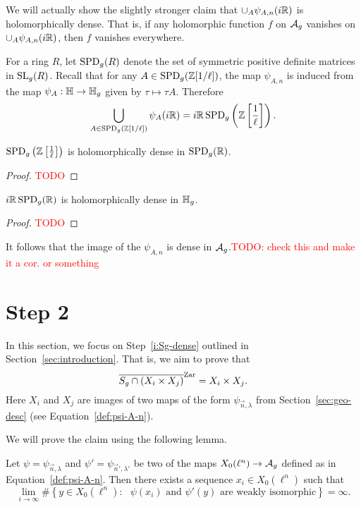 \documentclass{amsart}
\begin{document}
We will actually show the slightly stronger claim that $\cup_{A} \psi_{A,n}(i\mathbb{R})$ is holomorphically dense. That is, if any holomorphic function $f$ on $\mathcal{A}_g$ vanishes on $\cup_{A} \psi_{A,n}(i\mathbb{R})$, then $f$ vanishes everywhere.

For a ring $R$, let $\operatorname{SPD}_g(R)$ denote the set of symmetric positive definite matrices in $\operatorname{SL}_g(R)$. Recall that for any $A \in \operatorname{SPD}_g(\mathbb{Z}[1/\ell])$, the map $\psi_{A,n}$ is induced from the map $\psi_A: \mathbb{H} \to \mathbb{H}_g$ given by $\tau \mapsto \tau A$. Therefore
\[
  \bigcup_{A \in \operatorname{SPD}_g(\mathbb{Z}[1/\ell])} \psi_A(i\mathbb{R}) = i\mathbb{R}\operatorname{SPD}_g\left(\mathbb{Z}\left[\frac{1}{\ell}\right]\right).
\]

\begin{lemma}
  $\operatorname{SPD}_g\left(\mathbb{Z}\left[\frac{1}{\ell}\right]\right)$ is holomorphically dense in $\operatorname{SPD}_g(\mathbb{R})$.
\end{lemma}
\begin{proof}
  \textcolor{red}{TODO}
\end{proof}

\begin{lemma}
  $i\mathbb{R}\operatorname{SPD}_g(\mathbb{R})$ is holomorphically dense in $\mathbb{H}_g$.
\end{lemma}
\begin{proof}
  \textcolor{red}{TODO}
\end{proof}

It follows that the image of the $\psi_{A,n}$ is dense in $\mathcal{A}_g$.\textcolor{red}{TODO: check this and make it a cor. or something}

\section{Step 2}
\label{sec:step-2}

In this section, we focus on Step~\ref{i:Sg-dense} outlined in Section~\ref{sec:introduction}. That is, we aim to prove that
\[
  \overline{S_g \cap (X_i \times X_j)}^\mathrm{Zar} = X_i \times X_j.
\]
Here $X_i$ and $X_j$ are images of two maps of the form $\psi_{\vec{n},\lambda}$ from Section~\ref{sec:geo-desc} (see Equation~\ref{def:psi-A-n}).

We will prove the claim using the following lemma.

\begin{lemma}\label{lem:lim-degree}
  Let $\psi = \psi_{\vec{n},\lambda}$ and $\psi' = \psi_{\vec{n}',\lambda'}$ be two of the maps $X_0(\ell^n) \to \mathcal{A}_g$ defined as in Equation~\ref{def:psi-A-n}. Then there exists a sequence $x_i \in X_0(\ell^n)$ such that
  \[
    \lim_{i \to \infty}\#\left\{ y \in X_0(\ell^n) \colon \text{ $\psi(x_i)$ and $\psi'(y)$ are weakly isomorphic} \right\} = \infty.
  \]
\end{lemma}
\end{document}
